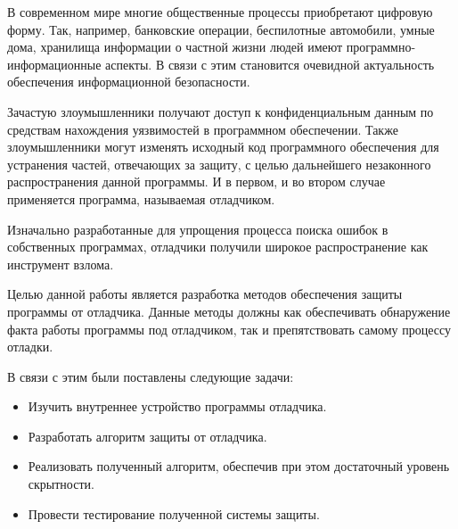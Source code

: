 
В современном мире многие  общественные процессы приобретают цифровую форму.
Так, например, банковские операции, беспилотные автомобили, умные дома,
хранилища информации о частной жизни людей имеют программно-информационные
аспекты. В связи с этим становится очевидной актуальность обеспечения
информационной безопасности. 

Зачастую злоумышленники получают доступ к конфиденциальным данным по средствам
нахождения уязвимостей в программном обеспечении. Также злоумышленники могут
изменять исходный код программного обеспечения для устранения частей, отвечающих
за защиту, с целью дальнейшего незаконного распространения данной программы. И в
первом, и во втором случае применяется программа, называемая отладчиком. 

Изначально разработанные для упрощения процесса поиска ошибок в собственных
программах, отладчики получили широкое распространение как инструмент взлома. 

Целью данной работы является разработка методов обеспечения защиты программы от
отладчика. Данные методы должны как обеспечивать обнаружение факта работы
программы под отладчиком, так и препятствовать самому процессу отладки.

В связи с этим были поставлены следующие задачи:
\begin{itemize}
  \item Изучить внутреннее устройство программы отладчика.
  \item Разработать алгоритм защиты от отладчика.
  \item Реализовать полученный алгоритм, обеспечив при этом достаточный
    уровень скрытности.
  \item Провести тестирование полученной системы защиты.
\end{itemize}
